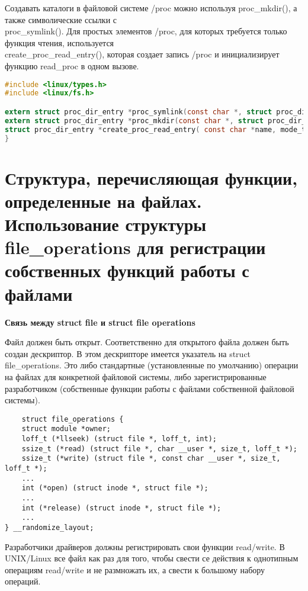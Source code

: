 Создавать каталоги в файловой системе /proc можно используя proc\_mkdir(), а также символические ссылки с \\ proc\_symlink(). Для простых элементов /proc, для которых требуется только функция чтения, используется \\ create\_proc\_read\_entry(), которая создает запись /proc и инициализирует функцию read\_proc в одном вызове.

\begin{lstlisting}[language=C, label=lst:1, caption= Хз чо это]
#include <linux/types.h>
#include <linux/fs.h>

extern struct proc_dir_entry *proc_symlink(const char *, struct proc_dir_entry *, const char *);
extern struct proc_dir_entry *proc_mkdir(const char *, struct proc_dir_entry *);
struct proc_dir_entry *create_proc_read_entry( const char *name, mode_t mode, struct proc_dir_entry *base, read_proc_t *read_proc, void *data );
}
\end{lstlisting}

\section{Структура, перечисляющая функции, определенные на файлах. Использование структуры file\_operations для регистрации собственных функций работы с файлами}

\textbf{Связь между struct file и struct file operations}

Файл должен быть открыт. Соответственно для открытого файла должен быть создан дескриптор. В этом дескрипторе имеется указатель на struct file\_operations. Это либо стандартные (установленные по умолчанию) операции на файлах для конкретной файловой системы, либо зарегистрированные разработчиком (собственные функции работы с файлами собственной файловой системы).

\begin{lstlisting}
	struct file_operations {
	struct module *owner;
	loff_t (*llseek) (struct file *, loff_t, int);
	ssize_t (*read) (struct file *, char __user *, size_t, loff_t *);
	ssize_t (*write) (struct file *, const char __user *, size_t, loff_t *);
	...
	int (*open) (struct inode *, struct file *);
	...
	int (*release) (struct inode *, struct file *);
	...
} __randomize_layout;
\end{lstlisting}

Разработчики драйверов должны регистрировать свои функции read/write. В UNIX/Linux все файл как раз для того, чтобы свести се действия к однотипным операциям read/write и не размножать их, а свести к большому набору операций.

